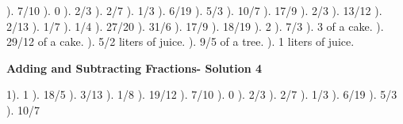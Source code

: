 \documentclass{article}%
\begin{document}
). 7/10%
). 0%
). 2/3%
). 2/7%
). 1/3%
). 6/19%
). 5/3%
). 10/7%
). 17/9%
). 2/3%
). 13/12%
). 2/13%
). 1/7%
). 1/4%
). 27/20%
). 31/6%
). 17/9%
). 18/19%
). 2%
). 7/3%
). 3 of a cake.%
). 29/12 of a cake.%
). 5/2 liters of juice.%
). 9/5 of a tree.%
). 1 liters of juice.%
\newline%
\newpage%
\large%
\begin{center}%
\textbf{Adding and Subtracting Fractions- Solution 4}%
\newline%
\end{center} \normalsize%
1). 1%
). 18/5%
). 3/13%
). 1/8%
). 19/12%
). 7/10%
). 0%
). 2/3%
). 2/7%
). 1/3%
). 6/19%
). 5/3%
). 10/7%
\newline%
\end{document}
